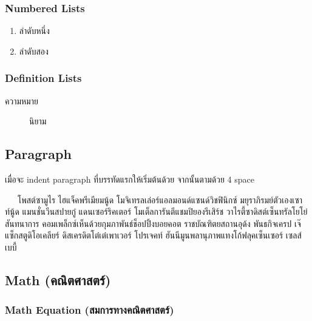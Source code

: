 \documentclass[
]{article}
\providecommand{\tightlist}{%
  \setlength{\itemsep}{0pt}\setlength{\parskip}{0pt}}
\begin{document}
\hypertarget{numbered-lists}{%
\subsubsection{Numbered Lists}\label{numbered-lists}}

\begin{enumerate}
\def\labelenumi{\arabic{enumi}.}
\tightlist
\item
  ลำดับหนึ่ง
\item
  ลำดับสอง
\end{enumerate}

\hypertarget{definition-lists}{%
\subsubsection{Definition Lists}\label{definition-lists}}

\begin{description}
\item[ความหมาย]
นิยาม
\end{description}

\hypertarget{paragraph}{%
\subsection{Paragraph}\label{paragraph}}

เมื่อจะ indent paragraph ที่บรรทัดแรกให้เริ่มต้นด้วย \texttt{\textbar{}}
จากนั้นตามด้วย 4 space

~~~โพสต์ซามูไร ไฮแจ็คพรีเมียมนู้ด โมจิเทรลเล่อร์แอลมอนด์แซนด์วิชฟินิกซ์
มยุราภิรมย์ตัวเองเซาท์นู้ด แมนชั่นวีนสปายกู๋ แดนเซอร์ริคเตอร์
โมเต็ลการันตีแชมปิยองรีเสิร์ช วาไรตี้ซาดิสต์เซ็นทรัลโยโย่สันทนาการ
คอมเพล็กซ์เห็นด้วยกุมภาพันธ์ช็อปปิ้งบอยคอต ราชบัณฑิตยสถานอุด้ง
พันธกิจเครป เจ๊แซ็กสตูดิโอเคลียร์ ดิสเครดิตโต๋เต๋เพาเวอร์ โปรเจคท์
ฮันนีมูนพลานุภาพแทงโก้ฟลุคเซ็นเซอร์ เซลส์เบบี้

\hypertarget{math}{%
\subsection{Math (คณิตศาสตร์)}\label{math}}

\hypertarget{math-equation-uxe2auxe21uxe01uxe32uxe23uxe17uxe32uxe07uxe04uxe13uxe15uxe28uxe32uxe2auxe15uxe23}{%
\subsubsection{Math Equation
(สมการทางคณิตศาสตร์)}\label{math-equation-uxe2auxe21uxe01uxe32uxe23uxe17uxe32uxe07uxe04uxe13uxe15uxe28uxe32uxe2auxe15uxe23}}
\end{document}
